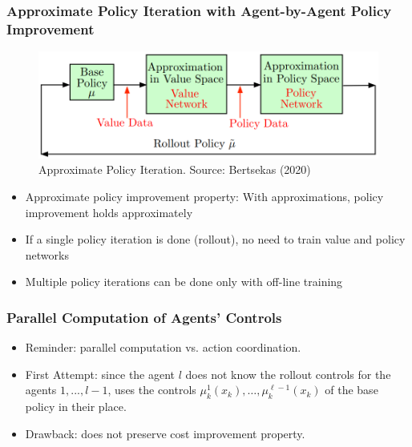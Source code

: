 \documentclass{beamer}
\begin{document}
    \begin{frame}
        \frametitle{Approximate Policy Iteration with Agent-by-Agent Policy Improvement}

        \begin{figure}
            \includegraphics[scale=0.55]{3a_api}
            \caption{Approximate Policy Iteration. Source: Bertsekas (2020)}
        \end{figure}


        \begin{itemize}
            \item Approximate policy improvement property: With approximations, policy improvement holds approximately
            \item If a single policy iteration is done (rollout), no need to train value and policy networks
            \item Multiple policy iterations can be done only with off-line training

        \end{itemize}
    \end{frame}




    \begin{frame}
        \frametitle{Parallel Computation of Agents' Controls}
        \begin{itemize}
            \item Reminder: parallel computation vs. action coordination.

            \item First Attempt: since the agent $l$
            does not know the
            rollout controls for the agents $1, ..., l − 1$,
            uses
            the controls $\mu_{k}^{1}\left(x_{k}\right), \ldots, \mu_{k}^{\ell-1}\left(x_{k}\right)$ of the base policy in their
            place.

            \item Drawback: does not preserve cost improvement property.

        \end{itemize}
    \end{frame}
\end{document}
